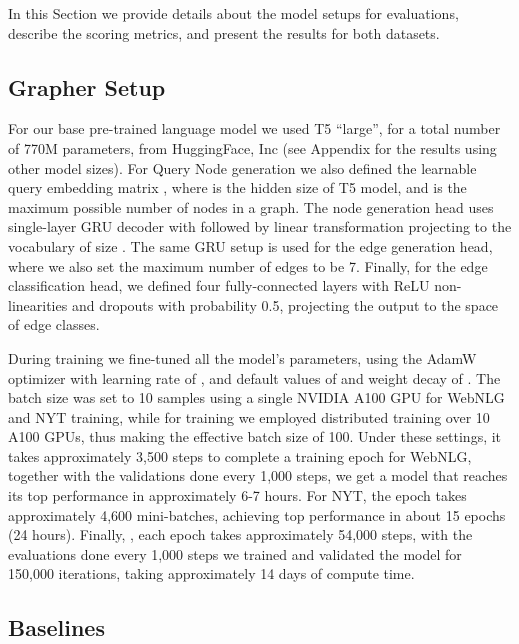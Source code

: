 In this Section we provide details about the model setups for evaluations, describe the scoring metrics, and present the results for both datasets.

\subsection{Grapher Setup}
For our base pre-trained language model we used T5 ``large'', for a total number of 770M parameters, from HuggingFace, Inc \cite{wolf2020transformers} (see Appendix for the results using other model sizes). For Query Node generation we also defined the learnable query embedding matrix , where  is the hidden size of T5 model, and  is the maximum possible number of nodes in a graph. The node generation head uses single-layer GRU decoder with  followed by linear transformation projecting to the vocabulary of size . The same GRU setup is used for the edge generation head, where we also set the maximum number of edges to be 7. Finally, for the edge classification head, we defined four fully-connected layers with ReLU non-linearities and dropouts with probability 0.5, projecting the output to the space of edge classes.

During training we fine-tuned all the model's parameters, using the AdamW optimizer with learning rate of , and default values of  and weight decay of . The batch size was set to 10 samples using a single NVIDIA A100 GPU for WebNLG and NYT training, while for \tekgen training we employed distributed training over 10 A100 GPUs, thus making the effective batch size of 100. Under these settings, it takes approximately 3,500 steps to complete a training epoch for WebNLG, together with the validations done every 1,000 steps, we get a model that reaches its top performance in approximately 6-7 hours. For NYT, the epoch takes approximately 4,600 mini-batches, achieving top performance in about 15 epochs (24 hours). Finally, \tekgen, each epoch takes approximately 54,000 steps, with the evaluations done every 1,000 steps we trained and validated the model for 150,000 iterations, taking approximately 14 days of compute time. 

\subsection{Baselines}

